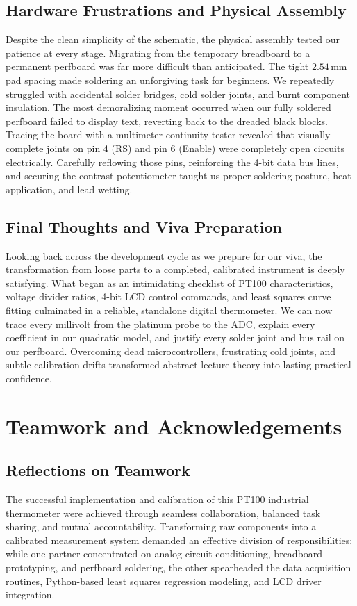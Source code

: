 \documentclass[journal,12pt,onecolumn]{IEEEtran}
\begin{document}
\subsection{Hardware Frustrations and Physical Assembly}
Despite the clean simplicity of the schematic, the physical assembly tested our patience at every stage. Migrating from the temporary breadboard to a permanent perfboard was far more difficult than anticipated. The tight $2.54\,\text{mm}$ pad spacing made soldering an unforgiving task for beginners. We repeatedly struggled with accidental solder bridges, cold solder joints, and burnt component insulation. The most demoralizing moment occurred when our fully soldered perfboard failed to display text, reverting back to the dreaded black blocks. Tracing the board with a multimeter continuity tester revealed that visually complete joints on pin 4 (RS) and pin 6 (Enable) were completely open circuits electrically. Carefully reflowing those pins, reinforcing the 4-bit data bus lines, and securing the contrast potentiometer taught us proper soldering posture, heat application, and lead wetting.

\subsection{Final Thoughts and Viva Preparation}
Looking back across the development cycle as we prepare for our viva, the transformation from loose parts to a completed, calibrated instrument is deeply satisfying. What began as an intimidating checklist of PT100 characteristics, voltage divider ratios, 4-bit LCD control commands, and least squares curve fitting culminated in a reliable, standalone digital thermometer. We can now trace every millivolt from the platinum probe to the ADC, explain every coefficient in our quadratic model, and justify every solder joint and bus rail on our perfboard. Overcoming dead microcontrollers, frustrating cold joints, and subtle calibration drifts transformed abstract lecture theory into lasting practical confidence.

\newpage

\section{Teamwork and Acknowledgements}

\subsection*{Reflections on Teamwork}
The successful implementation and calibration of this PT100 industrial thermometer were achieved through seamless collaboration, balanced task sharing, and mutual accountability. Transforming raw components into a calibrated measurement system demanded an effective division of responsibilities: while one partner concentrated on analog circuit conditioning, breadboard prototyping, and perfboard soldering, the other spearheaded the data acquisition routines, Python-based least squares regression modeling, and LCD driver integration. 
\end{document}
